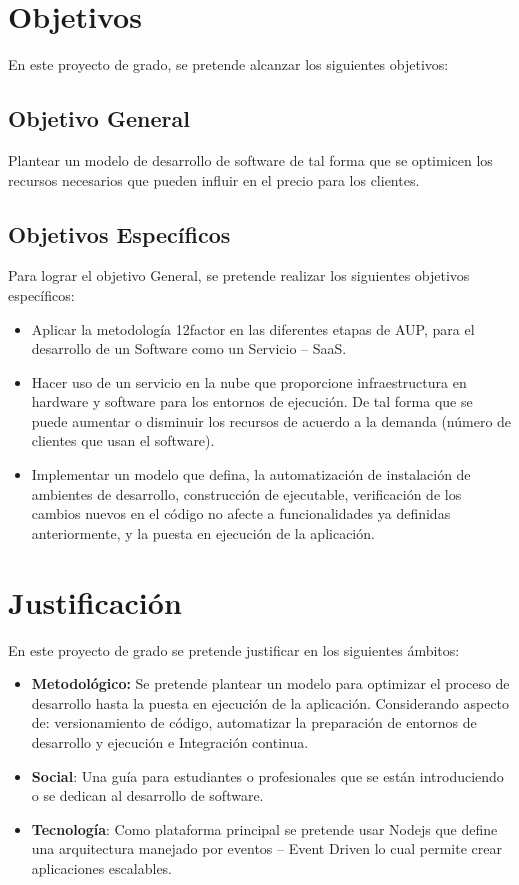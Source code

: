 \section{Objetivos}
\noindent En este proyecto de grado, se pretende alcanzar los siguientes objetivos:

\subsection{Objetivo General}

\noindent Plantear un modelo de desarrollo de software de tal forma que se optimicen los recursos necesarios que pueden influir en el precio para los clientes. 


\subsection{Objetivos Específicos}

\noindent Para lograr el objetivo General, se pretende realizar los siguientes objetivos específicos:
\begin{itemize}
  \item Aplicar la metodología 12factor en las diferentes etapas de AUP, para el desarrollo de un Software como un Servicio – SaaS.
  \item Hacer uso de un servicio en la nube que proporcione  infraestructura en hardware y software para los entornos de ejecución. De tal forma que se puede aumentar o disminuir los recursos de acuerdo a la demanda (número de clientes que usan el software).
  \item Implementar un modelo que defina, la automatización de instalación de ambientes de desarrollo, construcción de ejecutable, verificación de los cambios nuevos en el código no afecte a funcionalidades ya definidas anteriormente, y la puesta en ejecución de la aplicación.
\end{itemize}

\section{Justificación}
\noindent En este proyecto de grado se pretende justificar en los siguientes ámbitos:
\begin{itemize}
  \item \textbf{Metodológico:} Se pretende plantear un modelo para optimizar el proceso de desarrollo hasta la puesta en ejecución de la aplicación. Considerando aspecto de: versionamiento de código, automatizar la preparación de entornos de desarrollo y ejecución e Integración continua.
  \item \textbf{Social}: Una guía para estudiantes o profesionales que se están introduciendo o se dedican al desarrollo de software.
  \item \textbf{Tecnología}: Como plataforma principal se pretende usar Nodejs que define una arquitectura manejado por eventos – Event Driven lo cual permite crear aplicaciones escalables.
\end{itemize}

